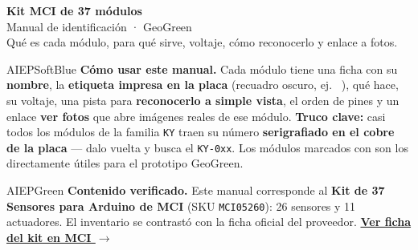 \documentclass[10pt,letterpaper]{article}
\newcommand{\serig}[1]{%
  \tcbox[on line, colback=AIEPInk, colframe=AIEPInk, boxrule=0pt,
    arc=0.8mm, left=1.6mm, right=1.6mm, top=0.4mm, bottom=0.4mm]%
    {\footnotesize\bfseries\textcolor{white}{\texttt{#1}}}%
}
\newcommand{\geogreen}{%
  \tcbox[on line, colback=AIEPGreen!12, colframe=AIEPGreen, boxrule=0.5pt,
    arc=0.8mm, left=1.6mm, right=1.6mm, top=0.4mm, bottom=0.4mm]%
    {\scriptsize\bfseries\textcolor{AIEPGreen}{\faLeaf\ GeoGreen}}%
}
\renewcommand{\geogreen}{%
  \tcbox[on line, colback=AIEPGreen!12, colframe=AIEPGreen, boxrule=0.5pt,
    arc=0.8mm, left=1.6mm, right=1.6mm, top=0.4mm, bottom=0.4mm]%
    {\scriptsize\bfseries\textcolor{AIEPGreen}{GeoGreen}}%
}
\begin{document}
\begin{tcolorbox}[enhanced, colback=AIEPNavy, colframe=AIEPNavy, arc=0mm,
  boxrule=0pt, left=5mm, right=5mm, top=5mm, bottom=5mm]
{\color{white}\Huge\bfseries Kit MCI de 37 módulos}\\[2mm]
{\color{white}\Large Manual de identificación · GeoGreen}\\[3mm]
{\color{AIEPSoftBlue} Qué es cada módulo, para qué sirve, voltaje, cómo reconocerlo y enlace a fotos.}
\end{tcolorbox}

\begin{infobox}{AIEPSoftBlue}
\textbf{Cómo usar este manual.} Cada módulo tiene una ficha con su \textbf{nombre},
la \textbf{etiqueta impresa en la placa} (recuadro oscuro, ej.\ \serig{KY-018}),
qué hace, su voltaje, una pista para \textbf{reconocerlo a simple vista}, el orden de pines
y un enlace \textcolor{AIEPRed}{\textbf{ver fotos}} que abre imágenes reales de ese módulo.
\textbf{Truco clave:} casi todos los módulos de la familia \texttt{KY} traen su número
\textbf{serigrafiado en el cobre de la placa} — dalo vuelta y busca el \texttt{KY-0xx}.
Los módulos marcados con \geogreen{} son los directamente útiles para el prototipo GeoGreen.
\end{infobox}

\begin{infobox}{AIEPGreen}
\textbf{Contenido verificado.} Este manual corresponde al \textbf{Kit de 37 Sensores para Arduino de MCI}
(SKU \texttt{MCI05260}): 26 sensores y 11 actuadores. El inventario se contrastó con la ficha oficial del proveedor.
\href{https://mcielectronics.cl/shop/product/kit-de-37-sensores-para-arduino-mci-electronics-25339/}{\textcolor{AIEPRed}{\textbf{Ver ficha del kit en MCI $\rightarrow$}}}
\end{infobox}

\end{document}
